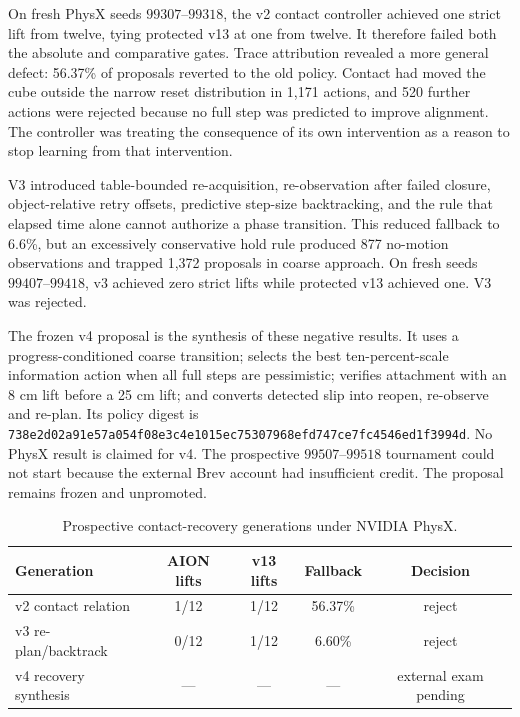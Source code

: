 \documentclass[11pt,a4paper]{article}
\begin{document}
On fresh PhysX seeds $99307$--$99318$, the v2 contact controller achieved one
strict lift from twelve, tying protected v13 at one from twelve.  It therefore
failed both the absolute and comparative gates.  Trace attribution revealed a
more general defect: 56.37\% of proposals reverted to the old policy.  Contact
had moved the cube outside the narrow reset distribution in 1,171 actions, and
520 further actions were rejected because no full step was predicted to improve
alignment.  The controller was treating the consequence of its own intervention
as a reason to stop learning from that intervention.

V3 introduced table-bounded re-acquisition, re-observation after failed closure,
object-relative retry offsets, predictive step-size backtracking, and the rule
that elapsed time alone cannot authorize a phase transition.  This reduced
fallback to 6.6\%, but an excessively conservative hold rule produced 877
no-motion observations and trapped 1,372 proposals in coarse approach.  On
fresh seeds $99407$--$99418$, v3 achieved zero strict lifts while protected v13
achieved one.  V3 was rejected.

The frozen v4 proposal is the synthesis of these negative results.  It uses a
progress-conditioned coarse transition; selects the best ten-percent-scale
information action when all full steps are pessimistic; verifies attachment
with an 8 cm lift before a 25 cm lift; and converts detected slip into reopen,
re-observe and re-plan.  Its policy digest is
\texttt{738e2d02a91e57a054f08e3c4e1015ec75307968efd747ce7fc4546ed1f3994d}.
No PhysX result is claimed for v4.  The prospective $99507$--$99518$ tournament
could not start because the external Brev account had insufficient credit.
The proposal remains frozen and unpromoted.

\begin{table}[htbp]
\centering
\caption{Prospective contact-recovery generations under NVIDIA PhysX.}
\begin{tabular}{lcccc}
\toprule
Generation & AION lifts & v13 lifts & Fallback & Decision \\
\midrule
v2 contact relation & 1/12 & 1/12 & 56.37\% & reject \\
v3 re-plan/backtrack & 0/12 & 1/12 & 6.60\% & reject \\
v4 recovery synthesis & --- & --- & --- & external exam pending \\
\bottomrule
\end{tabular}
\end{table}
\end{document}
